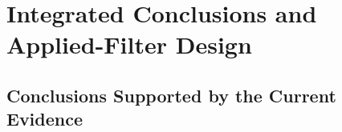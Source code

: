 \documentclass[11pt,a4paper]{article}
\begin{document}














\section{Integrated Conclusions and Applied-Filter Design}
\label{sec:conclusion}

\subsection{Conclusions Supported by the Current Evidence}
\end{document}
